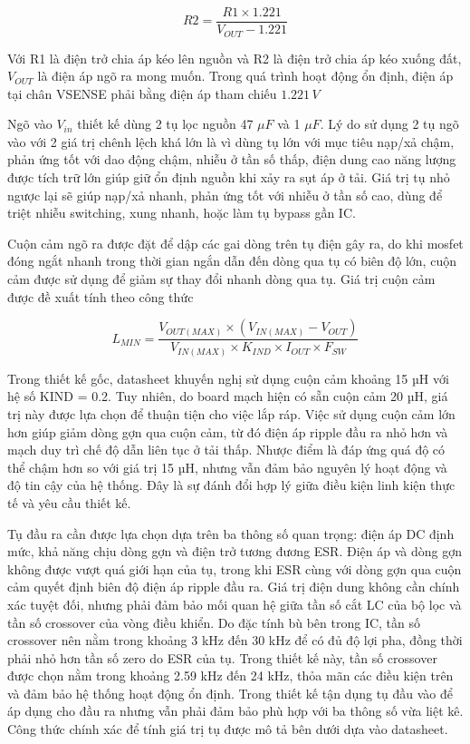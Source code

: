 \begin{equation}
R2 = \frac{R1 \times 1.221}{V_{OUT}- 1.221} 
\end{equation}

Với R1 là điện trở chia áp kéo lên nguồn và R2 là điện trở chia áp kéo xuống đất, $V_{OUT}$ là điện áp ngõ ra mong muốn. Trong quá trình hoạt động ổn định, điện áp tại chân VSENSE phải bằng điện áp tham chiếu \(1.221\,V\)

Ngõ vào $V_{in}$ thiết kế dùng 2 tụ lọc nguồn 47 $\mu F$ và 1 $\mu F$. Lý do sử dụng 2 tụ ngõ vào với 2 giá trị chênh lệch khá lớn là vì dùng tụ lớn với mục tiêu nạp/xả chậm, phản ứng tốt với dao động chậm, nhiễu ở tần số thấp, điện dung cao năng lượng được tích trữ lớn giúp giữ ổn định nguồn khi xảy ra sụt áp ở tải. Giá trị tụ nhỏ ngược lại sẽ giúp nạp/xả nhanh, phản ứng tốt với nhiễu ở tần số cao, dùng để triệt nhiễu switching, xung nhanh, hoặc làm tụ bypass gần IC.

Cuộn cảm ngõ ra được đặt để dập các gai dòng trên tụ điện gây ra, do khi mosfet đóng ngắt nhanh trong thời gian ngắn dẫn đến dòng qua tụ có biên độ lớn, cuộn cảm được sử dụng để giảm sự thay đổi nhanh dòng qua tụ. Giá trị cuộn cảm được đề xuất tính theo công thức 



\begin{equation}
L_{MIN} = \frac{V_{OUT(MAX)} \times (V_{IN(MAX)} - V_{OUT})}{V_{IN(MAX)} \times K_{IND} \times I_{OUT} \times F_{SW}}
\end{equation}

Trong thiết kế gốc, datasheet khuyến nghị sử dụng cuộn cảm khoảng 15 µH với hệ số KIND = 0.2. Tuy nhiên, do board mạch hiện có sẵn cuộn cảm 20 µH, giá trị này được lựa chọn để thuận tiện cho việc lắp ráp. Việc sử dụng cuộn cảm lớn hơn giúp giảm dòng gợn qua cuộn cảm, từ đó điện áp ripple đầu ra nhỏ hơn và mạch duy trì chế độ dẫn liên tục ở tải thấp. Nhược điểm là đáp ứng quá độ có thể chậm hơn so với giá trị 15 µH, nhưng vẫn đảm bảo nguyên lý hoạt động và độ tin cậy của hệ thống. Đây là sự đánh đổi hợp lý giữa điều kiện linh kiện thực tế và yêu cầu thiết kế.

Tụ đầu ra cần được lựa chọn dựa trên ba thông số quan trọng: điện áp DC định mức, khả năng chịu dòng gợn và điện trở tương đương ESR. Điện áp và dòng gợn không được vượt quá giới hạn của tụ, trong khi ESR cùng với dòng gợn qua cuộn cảm quyết định biên độ điện áp ripple đầu ra. Giá trị điện dung không cần chính xác tuyệt đối, nhưng phải đảm bảo mối quan hệ giữa tần số cắt LC của bộ lọc và tần số crossover của vòng điều khiển. Do đặc tính bù bên trong IC, tần số crossover nên nằm trong khoảng 3 kHz đến 30 kHz để có đủ độ lợi pha, đồng thời phải nhỏ hơn tần số zero do ESR của tụ. Trong thiết kế này, tần số crossover được chọn nằm trong khoảng 2.59 kHz đến 24 kHz, thỏa mãn các điều kiện trên và đảm bảo hệ thống hoạt động ổn định. Trong thiết kế tận dụng tụ đầu vào để áp dụng cho đầu ra nhưng vẫn phải đảm bảo phù hợp với ba thông số vừa liệt kê. Công thức chính xác để tính giá trị tụ được mô tả bên dưới dựa vào datasheet.

